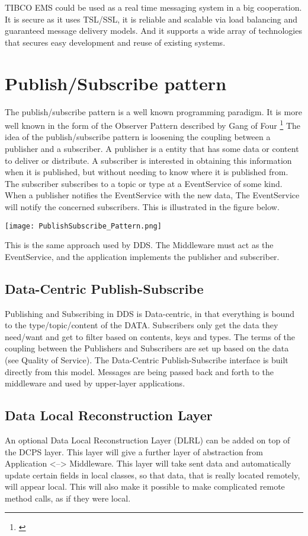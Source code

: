 TIBCO EMS could be used as a real time messaging system in a big cooperation. It is secure as it uses TSL/SSL, it is reliable and scalable via load balancing and guaranteed message delivery models. And it supports a wide array of technologies that secures easy development and reuse of existing systems.

\section{Publish/Subscribe pattern}
The publish/subscribe pattern is a well known programming paradigm. It is more well known in the form of the Observer Pattern described by Gang of Four \footnote{\citep{DesignPatterns}}
The idea of the publish/subscribe pattern is loosening the coupling between a publisher and a subscriber. A publisher is a entity that has some data or content to deliver or distribute. A subscriber is interested in obtaining this information when it is published, but without needing to know where it is published from.
The subscriber subscribes to a topic or type at a EventService of some kind. When a publisher notifies the EventService with the new data, The EventService will notify the concerned subscribers. This is illustrated in the figure below.

\begin{center}
	\texttt{[image: PublishSubscribe\_Pattern.png]}
\end{center}

This is the same approach used by DDS. The Middleware must act as the EventService, and the application implements the publisher and subscriber.

\subsection{Data-Centric Publish-Subscribe}
Publishing and Subscribing in DDS is Data-centric, in that everything is bound to the type/topic/content of the DATA. Subscribers only get the data they need/want and get to filter based on contents, keys and types. 
The terms of the coupling between the Publishers and Subscribers are set up based on the data (see Quality of Service). The Data-Centric Publish-Subscribe interface is built directly from this model. Messages are being passed back and forth to the middleware and used by upper-layer applications.

\subsection{Data Local Reconstruction Layer}
An optional Data Local Reconstruction Layer (DLRL) can be added on top of the DCPS layer. This layer will give a further layer of abstraction from Application <--> Middleware. 
This layer will take sent data and automatically update certain fields in local classes, so that data, that is really located remotely, will appear local. This will also make it possible to make complicated remote method calls, as if they were local. 

